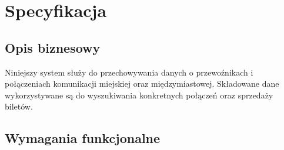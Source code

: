 \documentclass[10pt,a4paper]{article}
\begin{document}
\newpage
\tableofcontents
\newpage

\section{Specyfikacja}

\subsection{Opis biznesowy}
Niniejszy system służy do przechowywania danych o przewoźnikach i połączeniach komunikacji miejskiej oraz międzymiastowej. Składowane dane wykorzystywane są do wyszukiwania konkretnych połączeń oraz sprzedaży biletów.

\subsection{Wymagania funkcjonalne}
\end{document}

